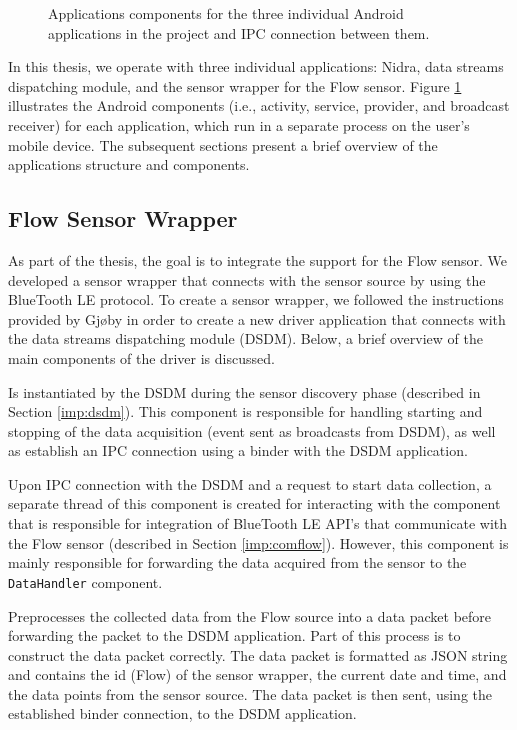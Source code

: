 \begin{figure}
    \caption{Applications components for the three individual Android applications in the project and IPC connection between them.}
    \label{fig:app_components}
\end{figure}


In this thesis, we operate with three individual applications: Nidra, data streams dispatching module, and the sensor wrapper for the Flow sensor. Figure \ref{fig:app_components} illustrates the Android components (i.e., activity, service, provider, and broadcast receiver) for each application, which run in a separate process on the user's mobile device. The subsequent sections present a brief overview of the applications structure and components.


\subsection{Flow Sensor Wrapper}\label{imp:flowsensor}
As part of the thesis, the goal is to integrate the support for the Flow sensor. We developed a sensor wrapper that connects with the sensor source by using the BlueTooth LE protocol. To create a sensor wrapper, we followed the instructions provided by Gjøby \cite{gjoby} in order to create a new driver application that connects with the data streams dispatching module (DSDM). Below, a brief overview of the main components of the driver is discussed.

\begin{description}[font=\normalfont\itshape]
    \item[WrapperService:] Is instantiated by the DSDM during the sensor discovery phase (described in Section \ref{imp:dsdm}). This component is responsible for handling starting and stopping of the data acquisition (event sent as broadcasts from DSDM), as well as establish an IPC connection using a binder with the DSDM application. 
    \item[CommunicationHandler:] Upon IPC connection with the DSDM and a request to start data collection, a separate thread of this component is created for interacting with the component that is responsible for integration of BlueTooth LE API's that communicate with the Flow sensor (described in Section \ref{imp:comflow}). However, this component is mainly responsible for forwarding the data acquired from the sensor to the \verb|DataHandler| component. 
    \item[DataHandler:] Preprocesses the collected data from the Flow source into a data packet before forwarding the packet to the DSDM application. Part of this process is to construct the data packet correctly. The data packet is formatted as JSON string and contains the id (Flow) of the sensor wrapper, the current date and time, and the data points from the sensor source. The data packet is then sent, using the established binder connection, to the DSDM application.
\end{description}

